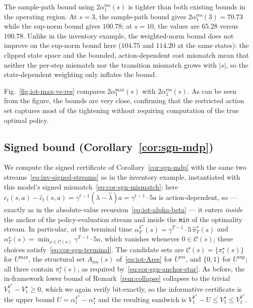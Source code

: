 \documentclass[10pt]{article}
\theoremstyle{definition}
\begin{document}
The sample-path bound using $2\alpha^{\mathrm{res}}_1(s)$ is tighter
than both existing bounds in the operating region. At $s = 3$, the
sample-path bound gives $2\alpha^{\mathrm{res}}_1(3) = 70.73$ while the
sup-norm bound gives $100.78$; at $s = 10$, the values are $65.28$
versus $100.78$. Unlike in the inventory example, the weighted-norm
bound does not improve on the sup-norm bound here ($104.75$ and
$114.20$ at the same states): the clipped state space and the bounded,
action-dependent cost mismatch mean that neither the per-step mismatch
nor the transition mismatch grows with $|s|$, so the state-dependent
weighting only inflates the bound.

Fig.~\ref{fig:iot-max-vs-res} compares $2\alpha^{\max}_1(s)$ with
$2\alpha^{\mathrm{res}}_1(s)$. As can be seen from the figure, the
bounds are very close, confirming that the restricted action set
captures most of the tightening without requiring computation of the
true optimal policy.

\subsection*{Signed bound (Corollary~\ref{cor:sgn-mdp})}

We compute the signed certificate of Corollary~\ref{cor:sgn-mdp} with
the same two streams~\eqref{eq:inv-signed-streams} as in the inventory
example, instantiated with this model's signed
mismatch~\eqref{eq:cor-sgn-mismatch}: here
$c_t(s,a) - \hat c_t(s,a) = \gamma^{t-1}(\lambda - \hat\lambda)a
= \gamma^{t-1}\cdot 5a$ is action-dependent, so --- exactly as in the
absolute-value recursion~\eqref{eq:iot-alpha-beta} --- it enters
\emph{inside} the anchor of the policy-evaluation stream and inside the
\texttt{min} of the optimality stream. In particular, at the terminal
time $\alpha^{\hat\pi^\star}_T(s) = \gamma^{T-1}\cdot
5\,\hat\pi^\star_T(s)$ and $\alpha^\star_T(s) = \min_{a \in
\mathcal{C}(s)} \gamma^{T-1}\cdot 5a$, which vanishes whenever
$0 \in \mathcal{C}(s)$; these choices
satisfy~\eqref{eq:cor-sgn-terminal}. The candidate sets are
$\mathcal{C}(s) = \{\pi^\star_t(s)\}$ for $U^{\max}$, the structural
set $A_{\mathrm{res}}(s)$ of~\eqref{eq:iot-Ares} for
$U^{\mathrm{res}}$, and $\{0,1\}$ for $U^{\sup}$; all three
contain $\pi^\star_t(s)$, as required
by~\eqref{eq:cor-sgn-anchor-star}. As before, the in-framework lower
bound of Remark~\ref{rem:collapse} collapses to the trivial
$V^{\hat\pi^\star}_1 - V^\star_1 \ge 0$, which we again verify
bit-exactly, so the informative certificate is the upper bound
$U = \alpha^{\hat\pi^\star}_1 - \alpha^\star_1$ and the resulting
sandwich is $V^{\hat\pi^\star}_1 - U \le V^\star_1 \le
V^{\hat\pi^\star}_1$.
\end{document}
